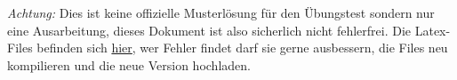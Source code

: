 \documentclass[crop=false]{standalone}
\begin{document}
\begin{disclaimer}
\emph{Achtung:} Dies ist keine offizielle Musterlösung für den Übungstest sondern nur eine Ausarbeitung, dieses Dokument ist also sicherlich nicht fehlerfrei. Die Latex-Files befinden sich \href{https://github.com/FritzMichael/AUT1_UE_2017_Klausur2}{hier}, wer Fehler findet darf sie gerne ausbessern, die Files neu kompilieren und die neue Version hochladen.
\end{disclaimer}
\end{document}
